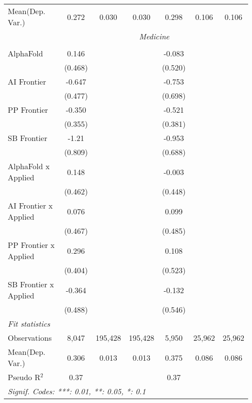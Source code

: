 \begin{tabular}{lcccccc}
Mean(Dep. Var.) & 0.272 & 0.030 & 0.030 & 0.298 & 0.106 & 0.106 \\
 & \multicolumn{6}{c}{\textit{Medicine}} \\ \\
   AlphaFold             & 0.146    &         &         & -0.083  &        &   \\   
                         & (0.468)  &         &         & (0.520) &        &   \\   
   AI Frontier           & -0.647   &         &         & -0.753  &        &   \\   
                         & (0.477)  &         &         & (0.698) &        &   \\   
   PP Frontier           & -0.350   &         &         & -0.521  &        &   \\   
                         & (0.355)  &         &         & (0.381) &        &   \\   
   SB Frontier           & -1.21    &         &         & -0.953  &        &   \\   
                         & (0.809)  &         &         & (0.688) &        &   \\   
   AlphaFold x Applied   & 0.148    &         &         & -0.003  &        &   \\   
                         & (0.462)  &         &         & (0.448) &        &   \\   
   AI Frontier x Applied & 0.076    &         &         & 0.099   &        &   \\   
                         & (0.467)  &         &         & (0.485) &        &   \\   
   PP Frontier x Applied & 0.296    &         &         & 0.108   &        &   \\   
                         & (0.404)  &         &         & (0.523) &        &   \\   
   SB Frontier x Applied & -0.364   &         &         & -0.132  &        &   \\   
                         & (0.488)  &         &         & (0.546) &        &   \\   
   \midrule
   \emph{Fit statistics}\\
   Observations          & 8,047    & 195,428 & 195,428 & 5,950   & 25,962 & 25,962\\  
Mean(Dep. Var.) & 0.306 & 0.013 & 0.013 & 0.375 & 0.086 & 0.086 \\
   Pseudo R$^2$          & 0.37     &         &         & 0.37    &        & \\  
   \midrule \midrule
   \multicolumn{7}{l}{\emph{Signif. Codes: ***: 0.01, **: 0.05, *: 0.1}}\\
\end{tabular}
\par\endgroup
